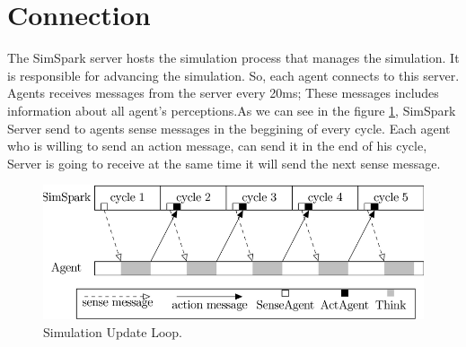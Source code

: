 \section{Connection}
The SimSpark server hosts the simulation process that manages the simulation. It is responsible for advancing the simulation. So, each agent
connects to this server. Agents receives messages from the server every 20ms; These messages includes information about all agent's perceptions.As we can see in the figure \ref{fig:Simulation-Update-Loop}, SimSpark Server send to agents sense messages in the beggining of every cycle. Each agent who is willing to send an action message, can send it in the end of his cycle, Server is going to receive at the same time it will send the next sense message.
\begin{figure}[!ht]
\centering
  \includegraphics[scale=0.4]{Chapter2/figures/800px-SimulationUpdateLoopSynchronizationBetweenSimSparkAndAgent.png}
  \caption{Simulation Update Loop.}
  \label{fig:Simulation-Update-Loop}
\end{figure}



